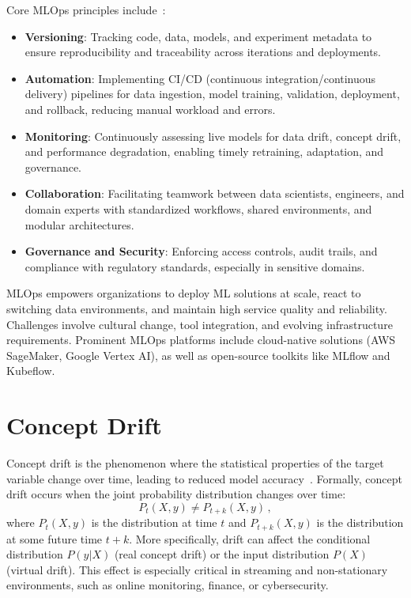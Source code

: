 Core MLOps principles include~\cite{tabassam2023mlops}:
\begin{itemize}
    \item \textbf{Versioning}: Tracking code, data, models, and experiment metadata to ensure reproducibility and traceability across iterations and deployments.
    \item \textbf{Automation}: Implementing CI/CD (continuous integration/continuous delivery) pipelines for data ingestion, model training, validation, deployment, and rollback, reducing manual workload and errors.
    \item \textbf{Monitoring}: Continuously assessing live models for data drift, concept drift, and performance degradation, enabling timely retraining, adaptation, and governance.
    \item \textbf{Collaboration}: Facilitating teamwork between data scientists, engineers, and domain experts with standardized workflows, shared environments, and modular architectures.
    \item \textbf{Governance and Security}: Enforcing access controls, audit trails, and compliance with regulatory standards, especially in sensitive domains.
\end{itemize}

MLOps empowers organizations to deploy ML solutions at scale, react to switching data environments, and maintain high service quality and reliability.
Challenges involve cultural change, tool integration, and evolving infrastructure requirements.
Prominent MLOps platforms include cloud-native solutions (AWS SageMaker, Google Vertex AI), as well as open-source toolkits like MLflow and Kubeflow.

\section{Concept Drift}

Concept drift is the phenomenon where the statistical properties of the target variable change over time, leading to reduced model accuracy~\cite{lu2018learning}.
Formally, concept drift occurs when the joint probability distribution changes over time:
\[
    P_t(X, y) \neq P_{t+k}(X, y) \, ,
\]
where $P_t(X, y)$ is the distribution at time $t$ and $P_{t+k}(X, y)$ is the distribution at some future time $t+k$.
More specifically, drift can affect the conditional distribution $P(y|X)$ (real concept drift) or the input distribution $P(X)$ (virtual drift).
This effect is especially critical in streaming and non-stationary environments, such as online monitoring, finance, or cybersecurity.

